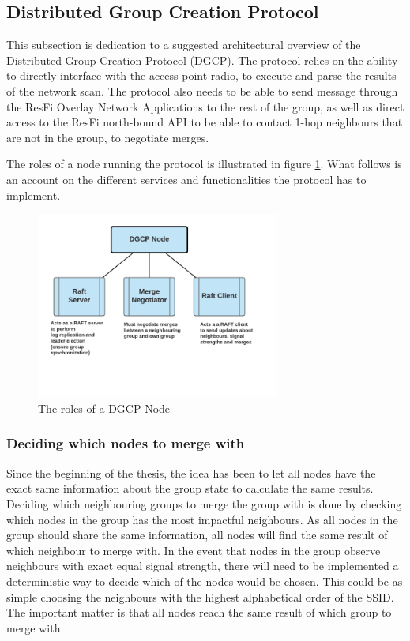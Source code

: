 \subsection{Distributed Group Creation Protocol}
This subsection is dedication to a suggested architectural overview of the Distributed Group Creation Protocol (DGCP). 
The protocol relies on the ability to directly interface with the access point radio, to execute and parse the results of the network scan. The protocol also
needs to be able to send message through the ResFi Overlay Network Applications to the rest of the group, as well as direct access to the ResFi north-bound API to be able to contact 1-hop
neighbours that are not in the group, to negotiate merges. 

The roles of a node running the protocol is illustrated in figure \ref{fig:dgcproles}. What follows is an account on the different services and functionalities the protocol
has to implement.  

\begin{figure}
	\centering
	\includegraphics[width=8cm]{Images/dgcpnode.png}
		\caption{The roles of a DGCP Node }%
		\label{fig:dgcproles}%
\end{figure}

\subsubsection{Deciding which nodes to merge with}
Since the beginning of the thesis, the idea has been to let all nodes have the exact same information about the group state to calculate the same results. Deciding
which neighbouring groups to merge the group with is done by checking which nodes in the group has the most impactful neighbours. As all nodes in the group should share
the same information, all nodes will find the same result of which neighbour to merge with.
In the event that nodes in the group observe neighbours with exact equal signal strength, there will need to be implemented a deterministic way to decide which of the nodes would be chosen.
This could be as simple choosing the neighbours with the highest alphabetical order of the SSID. The important matter is that all nodes reach the same result of which group to merge with. 

